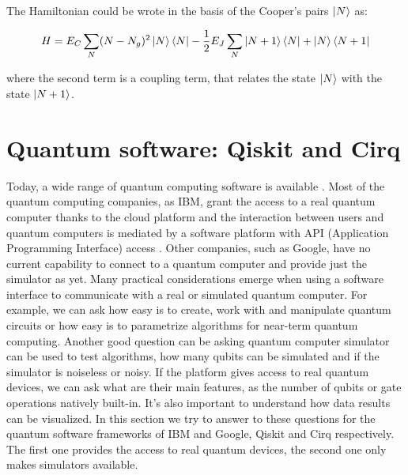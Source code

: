 \noindent The Hamiltonian could be wrote in the basis of the Cooper's pairs $\left| N \right \rangle$ as:

\begin{equation}
H = E_C \sum_N (N - N_g)^2 \left| N \right \rangle\left\langle N \right | - \frac{1}{2} E_J \sum_N \left| N+1 \right \rangle\left\langle N \right | + \left| N \right \rangle \left\langle N+1 \right |
\label{HamiltonianCooper_N}
\end{equation}

\noindent where the second term is a coupling term, that relates the state $\left| N \right \rangle$ with the state $\left| N+1 \right \rangle$.





\section{Quantum software: Qiskit and Cirq}
Today, a wide range of quantum computing software is available \cite{SoftwareComparisonGeneral}. Most of the quantum computing companies, as IBM, grant the access to a real quantum computer thanks to the cloud platform and the interaction between users and quantum computers is mediated by a software platform with API (Application Programming Interface) access \cite{SoftwareComparisonCirq}. Other companies, such as Google, have no current capability to connect to a quantum computer and provide just the simulator as yet.
Many practical considerations emerge when using a software interface to communicate with a real or simulated quantum computer. For example, we can ask how easy is to create, work with and manipulate quantum circuits or how easy is to parametrize algorithms for near-term quantum computing. Another good question can be asking quantum computer simulator can be used to test algorithms, how many qubits can be simulated and if the simulator is noiseless or noisy. If the platform gives access to real quantum devices, we can ask what are their main features, as the number of qubits or gate operations natively built-in. It's also important to understand how data results can be visualized.
 In this section we try to answer to these questions for the quantum software frameworks of IBM and Google, Qiskit and Cirq respectively. The first one provides the access to real quantum devices, the second one only makes simulators available.

